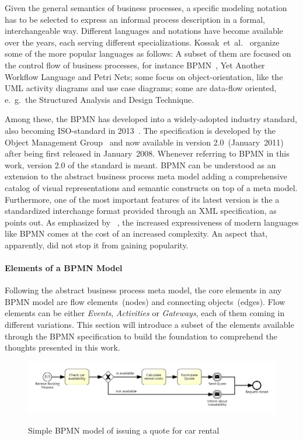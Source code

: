 Given the general semantics of business processes, a specific modeling notation has to be selected to express an informal process description in a formal, interchangeable way.
Different languages and notations have become available over the years, each serving different specializations.
Kossak~et~al.~\cite{kossak:bpmn2} organize some of the more popular languages as follows: A subset of them are focused on the control flow of business processes, for instance \ac{BPMN}~\cite{bpmnspec}, Yet Another Workflow Language and Petri Nets; some focus on object-orientation, like the \ac{UML} activity diagrams and use case diagrams; some are data-flow oriented, e.~g.~the Structured Analysis and Design Technique.

Among these, the \acf{BPMN} has developed into a widely-adopted industry standard, also becoming ISO-standard in 2013~\cite{iso2013bpmn}.
The specification is developed by the Object Management Group~\cite{omghome} and now available in version 2.0~(January~2011) after being first released in January~2008. Whenever referring to BPMN in this work, version 2.0 of the standard is meant.
\acs{BPMN} can be understood as an extension to the abstract business process meta model adding a comprehensive catalog of visual representations and semantic constructs on top of a meta model. Furthermore, one of the most important features of its latest version is the a standardized interchange format provided through an \acs{XML} specification, as \cite{weske:bpm-book} points out.
As emphasized by \citeauthor{Muehlen:2007}~\cite{Muehlen:2007}, the increased expressiveness of modern languages like \acs{BPMN} comes at the cost of an increased complexity. An aspect that, apparently, did not stop it from gaining popularity.

\paragraph{Elements of a BPMN Model}
Following the abstract business process meta model, the core elements in any BPMN model are flow elements~(nodes) and connecting objects~(edges).
Flow elements can be either \textit{Events}, \textit{Activities} or \textit{Gateways}, each of them coming in different variations.
This section will introduce a subset of the elements available through the \acs{BPMN} specification to build the foundation to comprehend the thoughts presented in this work.

\begin{figure}[]
	\myfloatalign
	{\includegraphics[width=1\linewidth]{chapters/background/intro-rental-car.png}}
	\caption{Simple BPMN model of issuing a quote for car rental}
	\label{fig:simple-bpmn-model}
\end{figure}

